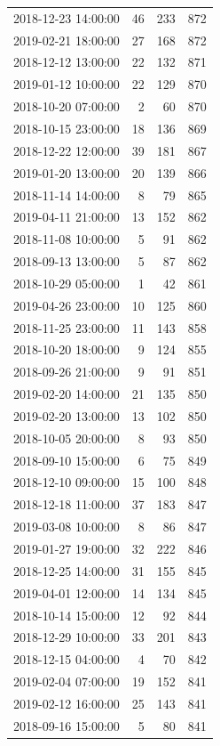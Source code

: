 \begin{tabular}{lrrr}
2018-12-23 14:00:00 & 46 & 233 & 872 \\
2019-02-21 18:00:00 & 27 & 168 & 872 \\
2018-12-12 13:00:00 & 22 & 132 & 871 \\
2019-01-12 10:00:00 & 22 & 129 & 870 \\
2018-10-20 07:00:00 & 2 & 60 & 870 \\
2018-10-15 23:00:00 & 18 & 136 & 869 \\
2018-12-22 12:00:00 & 39 & 181 & 867 \\
2019-01-20 13:00:00 & 20 & 139 & 866 \\
2018-11-14 14:00:00 & 8 & 79 & 865 \\
2019-04-11 21:00:00 & 13 & 152 & 862 \\
2018-11-08 10:00:00 & 5 & 91 & 862 \\
2018-09-13 13:00:00 & 5 & 87 & 862 \\
2018-10-29 05:00:00 & 1 & 42 & 861 \\
2019-04-26 23:00:00 & 10 & 125 & 860 \\
2018-11-25 23:00:00 & 11 & 143 & 858 \\
2018-10-20 18:00:00 & 9 & 124 & 855 \\
2018-09-26 21:00:00 & 9 & 91 & 851 \\
2019-02-20 14:00:00 & 21 & 135 & 850 \\
2019-02-20 13:00:00 & 13 & 102 & 850 \\
2018-10-05 20:00:00 & 8 & 93 & 850 \\
2018-09-10 15:00:00 & 6 & 75 & 849 \\
2018-12-10 09:00:00 & 15 & 100 & 848 \\
2018-12-18 11:00:00 & 37 & 183 & 847 \\
2019-03-08 10:00:00 & 8 & 86 & 847 \\
2019-01-27 19:00:00 & 32 & 222 & 846 \\
2018-12-25 14:00:00 & 31 & 155 & 845 \\
2019-04-01 12:00:00 & 14 & 134 & 845 \\
2018-10-14 15:00:00 & 12 & 92 & 844 \\
2018-12-29 10:00:00 & 33 & 201 & 843 \\
2018-12-15 04:00:00 & 4 & 70 & 842 \\
2019-02-04 07:00:00 & 19 & 152 & 841 \\
2019-02-12 16:00:00 & 25 & 143 & 841 \\
2018-09-16 15:00:00 & 5 & 80 & 841 \\

\end{tabular}
